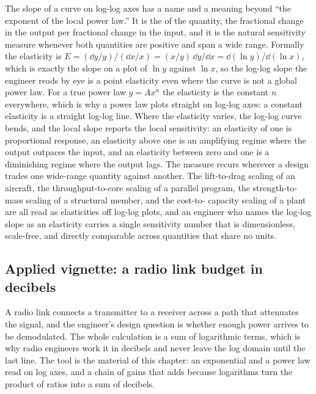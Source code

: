 \begin{mastery}
The slope of a curve on log-log axes has a name and a meaning beyond
``the exponent of the local power law.'' It is the 
of the quantity, the fractional change in the output per fractional
change in the input, and it is the natural sensitivity measure whenever
both quantities are positive and span a wide range. Formally the
elasticity is $E = (\dd y / y)/(\dd x / x) = (x/y)\,\dd y/\dd x =
\dd(\ln y)/\dd(\ln x)$, which is exactly the slope on a plot of $\ln y$
against $\ln x$, so the log-log slope the engineer reads by eye is a
point elasticity even where the curve is not a global power law. For a
true power law $y = A x^{n}$ the elasticity is the constant $n$
everywhere, which is why a power law plots straight on log-log axes: a
constant elasticity is a straight log-log line. Where the elasticity
varies, the log-log curve bends, and the local slope reports the local
sensitivity: an elasticity of one is proportional response, an
elasticity above one is an amplifying regime where the output outpaces
the input, and an elasticity between zero and one is a diminishing
regime where the output lags. The measure recurs wherever a design
trades one wide-range quantity against another. The lift-to-drag scaling
of an aircraft, the throughput-to-core scaling of a parallel program,
the strength-to-mass scaling of a structural member, and the cost-to-
capacity scaling of a plant are all read as elasticities off log-log
plots, and an engineer who names the log-log slope as an elasticity
carries a single sensitivity number that is dimensionless, scale-free,
and directly comparable across quantities that share no units.
\end{mastery}

\subsection{Applied vignette: a radio link budget in decibels}

A radio link connects a transmitter to a receiver across a path that
attenuates the signal, and the engineer's design question is whether
enough power arrives to be demodulated. The whole calculation is a
sum of logarithmic terms, which is why radio engineers work it in
decibels and never leave the log domain until the last line. The tool
is the material of this chapter: an exponential and a power law read
on log axes, and a chain of gains that adds because logarithms turn
the product of ratios into a sum of decibels.

